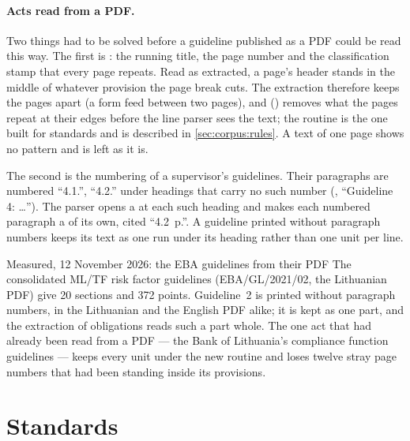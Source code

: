 \paragraph{Acts read from a PDF.} Two things had to be solved before a guideline published as
a PDF could be read this way. The first is : the running title, the
page number and the classification stamp that every page repeats. Read as extracted, a page's
header stands in the middle of whatever provision the page break cuts. The extraction
therefore keeps the pages apart (a form feed between two pages), and
 () removes what the pages repeat at their
edges before the line parser sees the text; the routine is the one built for standards and is
described in \cref{sec:corpus:rules}. A text of one page shows no pattern and is left as it
is.

The second is the numbering of a supervisor's guidelines. Their paragraphs are numbered
\enquote{4.1.}, \enquote{4.2.} under headings that carry no such number
(, \enquote{Guideline 4: …}). The parser
opens a  at each such heading and makes each numbered paragraph a 
of its own, cited \enquote{4.2~p.}. A guideline printed without paragraph numbers keeps its
text as one run under its heading rather than one unit per line.

\begin{lessonbox}{Measured, 12 November 2026: the EBA guidelines from their PDF}
The consolidated ML/TF risk factor guidelines (EBA/GL/2021/02, the Lithuanian PDF) give 20
sections and 372 points. Guideline~2 is printed without paragraph numbers, in the Lithuanian
and the English PDF alike; it is kept as one part, and the extraction of obligations reads
such a part whole. The one act that had already been read from a PDF --- the Bank of
Lithuania's compliance function guidelines --- keeps every unit under the new routine and
loses twelve stray page numbers that had been standing inside its provisions.
\end{lessonbox}


\section{Standards}\label{sec:corpus:standards}

